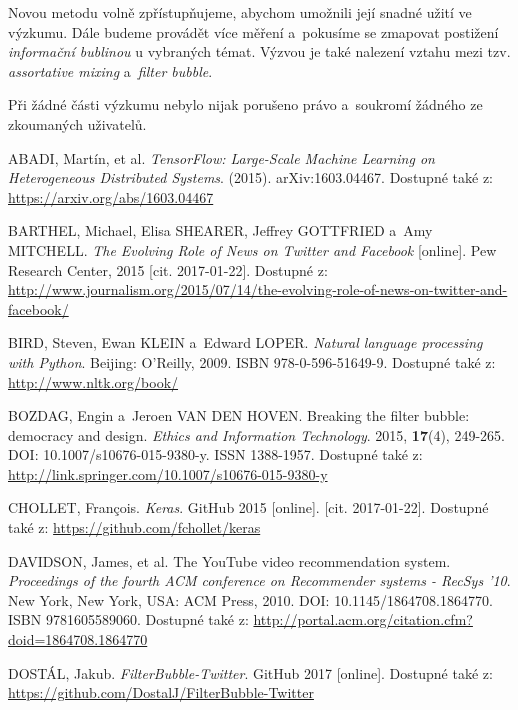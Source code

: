 \documentclass[12pt, a4paper]{article}
\numberwithin{equation}{section} 	%
\begin{document}
Novou metodu volně zpřístupňujeme, abychom umožnili její snadné užití ve výzkumu. Dále budeme provádět více měření a~pokusíme se zmapovat postižení \textit{informační bublinou} u vybraných témat. Výzvou je také nalezení vztahu mezi tzv. \textit{assortative mixing} a~\textit{filter bubble}.

Při žádné části výzkumu nebylo nijak porušeno právo a~soukromí žádného ze zkoumaných uživatelů.


\newpage
\begin{thebibliography}{99}

    ABADI, Martín, et al. \textit{TensorFlow: Large-Scale Machine Learning on Heterogeneous Distributed Systems}. (2015). arXiv:1603.04467. Dostupné také z: \url{https://arxiv.org/abs/1603.04467}

    BARTHEL, Michael, Elisa SHEARER, Jeffrey GOTTFRIED a~Amy MITCHELL. \textit{The Evolving Role of News on Twitter and Facebook} [online]. Pew Research Center, 2015 [cit. 2017-01-22]. Dostupné z: \url{http://www.journalism.org/2015/07/14/the-evolving-role-of-news-on-twitter-and-facebook/}

    BIRD, Steven, Ewan KLEIN a~Edward LOPER. \textit{Natural language processing with Python}. Beijing: O'Reilly, 2009. ISBN 978-0-596-51649-9. Dostupné také z: \url{http://www.nltk.org/book/}

    BOZDAG, Engin a~Jeroen VAN DEN HOVEN. Breaking the filter bubble: democracy and design. \textit{Ethics and Information Technology}. 2015, \textbf{17}(4), 249-265. DOI: 10.1007/s10676-015-9380-y. ISSN 1388-1957. Dostupné také z: \url{http://link.springer.com/10.1007/s10676-015-9380-y}

    CHOLLET, Fran\c{c}ois. \textit{Keras}. GitHub 2015 [online]. [cit. 2017-01-22]. Dostupné také z: \url{https://github.com/fchollet/keras}

    DAVIDSON, James, et al. The YouTube video recommendation system. \textit{Proceedings of the fourth ACM conference on Recommender systems - RecSys '10}. New York, New York, USA: ACM Press, 2010. DOI: 10.1145/1864708.1864770. ISBN 9781605589060. Dostupné také z: \url{http://portal.acm.org/citation.cfm?doid=1864708.1864770}

    DOSTÁL, Jakub. \textit{FilterBubble-Twitter}. GitHub 2017 [online]. Dostupné také z: \url{https://github.com/DostalJ/FilterBubble-Twitter}


\end{thebibliography}
\end{document}
